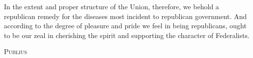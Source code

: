 In the extent and proper structure of the Union, therefore, we behold a republican remedy for the diseases most incident to republican government. 
And according to the degree of pleasure and pride we feel in being republicans, ought to be our zeal in cherishing the spirit and supporting the character of Federalists.

\vspace{.5cm}
\textsc{Publius}

\vspace{1.5cm}

